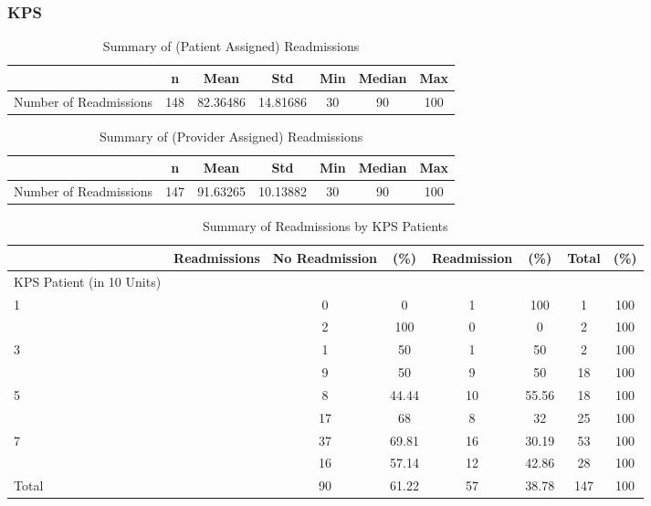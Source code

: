 \documentclass[12pt,]{article}
\begin{document}
\pagebreak

\subsubsection{KPS}\label{kps}

\begin{table}[!h]

\caption{\label{tab:unnamed-chunk-21}Summary of (Patient Assigned) Readmissions}
\centering
\begin{tabular}{>{\raggedright\arraybackslash}p{5cm}cccccc}
\toprule
  & n & Mean & Std & Min & Median & Max\\
\midrule
\rowcolor{white}  Number of Readmissions & 148 & 82.36486 & 14.81686 & 30 & 90 & 100\\
\bottomrule
\end{tabular}
\end{table}

\begin{table}[!h]

\caption{\label{tab:unnamed-chunk-21}Summary of (Provider Assigned) Readmissions}
\centering
\begin{tabular}{>{\raggedright\arraybackslash}p{5cm}cccccc}
\toprule
  & n & Mean & Std & Min & Median & Max\\
\midrule
\rowcolor{white}  Number of Readmissions & 147 & 91.63265 & 10.13882 & 30 & 90 & 100\\
\bottomrule
\end{tabular}
\end{table}

\begin{table}[!h]

\caption{\label{tab:unnamed-chunk-21}Summary of Readmissions by KPS Patients}
\centering
\begin{tabular}{>{\centering\arraybackslash}p{5cm}ccccccc}
\toprule
  & Readmissions & No Readmission & (\%) & Readmission & (\%) & Total & (\%)\\
\midrule
KPS Patient (in 10 Units) &  &  &  &  &  &  & \\
\rowcolor[HTML]{E3E5E7}  1 &  & 0 & 0 & 1 & 100 & 1 & 100\\
2 &  & 2 & 100 & 0 & 0 & 2 & 100\\
\rowcolor[HTML]{E3E5E7}  3 &  & 1 & 50 & 1 & 50 & 2 & 100\\
4 &  & 9 & 50 & 9 & 50 & 18 & 100\\
\addlinespace
\rowcolor[HTML]{E3E5E7}  5 &  & 8 & 44.44 & 10 & 55.56 & 18 & 100\\
6 &  & 17 & 68 & 8 & 32 & 25 & 100\\
\rowcolor[HTML]{E3E5E7}  7 &  & 37 & 69.81 & 16 & 30.19 & 53 & 100\\
8 &  & 16 & 57.14 & 12 & 42.86 & 28 & 100\\
\rowcolor[HTML]{E3E5E7}  Total &  & 90 & 61.22 & 57 & 38.78 & 147 & 100\\
\bottomrule
\end{tabular}
\end{table}
\end{document}
